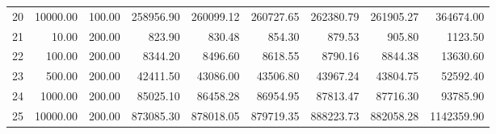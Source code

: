\begin{table}[ht]
\begin{tabular}{rrrrrrrrr}
  20 & 10000.00 & 100.00 & 258956.90 & 260099.12 & 260727.65 & 262380.79 & 261905.27 & 364674.00 \\ 
  21 & 10.00 & 200.00 & 823.90 & 830.48 & 854.30 & 879.53 & 905.80 & 1123.50 \\ 
  22 & 100.00 & 200.00 & 8344.20 & 8496.60 & 8618.55 & 8790.16 & 8844.38 & 13630.60 \\ 
  23 & 500.00 & 200.00 & 42411.50 & 43086.00 & 43506.80 & 43967.24 & 43804.75 & 52592.40 \\ 
  24 & 1000.00 & 200.00 & 85025.10 & 86458.28 & 86954.95 & 87813.47 & 87716.30 & 93785.90 \\ 
  25 & 10000.00 & 200.00 & 873085.30 & 878018.05 & 879719.35 & 888223.73 & 882058.28 & 1142359.90 \\ 
   \hline
\end{tabular}
\end{table}
